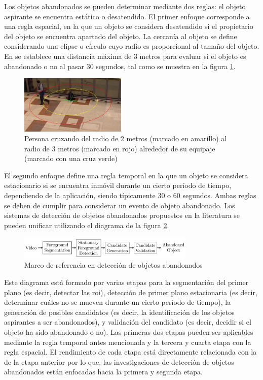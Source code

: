 Los objetos abandonados se pueden determinar mediante dos reglas: el objeto aspirante se encuentra estático o desatendido. El primer enfoque corresponde a una regla espacial, en la que un objeto se considera desatendido si el propietario del objeto se encuentra apartado del objeto. La cercanía al objeto se define considerando una elipse o círculo cuyo radio es proporcional al tamaño del objeto. En \cite{Lv06leftluggage} se establece una distancia máxima de 3 metros para evaluar si el objeto es abandonado o no al pasar 30 segundos, tal como se muestra en la figura \ref{fig:pets2006-3m}.

\begin{figure}[ht]
\centering
\includegraphics[width=0.45\textwidth]{img/chapters/introduccion/pets2006-3m.jpeg}
\caption{\label{fig:pets2006-3m}Persona cruzando del radio de 2 metros (marcado en amarillo) al radio de 3 metros (marcado en rojo) alrededor de su equipaje (marcado con una cruz verde) \cite{7789647}}
\end{figure}

El segundo enfoque define una regla temporal en la que un objeto se considera estacionario si se encuentra inmóvil durante un cierto período de tiempo, dependiendo de la aplicación, siendo típicamente 30 o 60 segundos. Ambas reglas se deben de cumplir para considerar un evento de objeto abandonado. Los sistemas de detección de objetos abandonados propuestos en la literatura se pueden unificar utilizando el diagrama de la figura \ref{fig:canonical-framework-aod}.

\begin{figure}[ht]
\centering
\includegraphics[width=0.75\textwidth]{img/chapters/introduccion/canonical-framework-aod.png}
\caption{\label{fig:canonical-framework-aod}Marco de referencia en detección de objetos abandonados \cite{luna2018}}
\end{figure}

Este diagrama está formado por varias etapas para la segmentación del primer plano (es decir, detectar las \gls{roi}), detección de primer plano estacionaria (es decir, determinar cuáles no se mueven durante un cierto período de tiempo), la generación de posibles candidatos (es decir, la identificación de los objetos aspirantes a ser abandonados), y validación del candidato (es decir, decidir si el objeto ha sido abandonado o no). Las primeras dos etapas pueden ser aplicables mediante la regla temporal antes mencionada y la tercera y cuarta etapa con la regla espacial. El rendimiento de cada etapa está directamente relacionada con la de la etapa anterior por lo que, las investigaciones de detección de objetos abandonados están enfocadas hacia la primera y segunda etapa.

